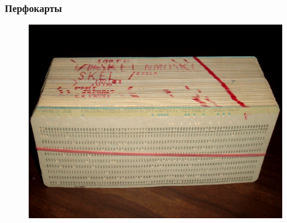 \documentclass[t,aspectratio=169]{beamer}
\begin{document}
\begin{frame}
    \frametitle{Перфокарты}
    \begin{figure}
        \begin{centering}
            \includegraphics[height=0.7\textwidth]{punched-cards}
        \end{centering}
    \end{figure}
\end{frame}
\end{document}
